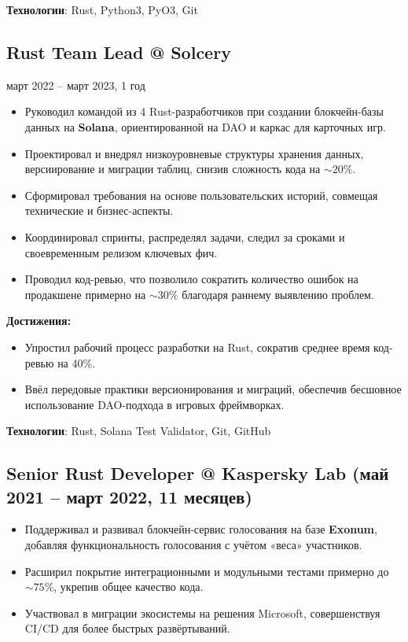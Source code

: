 \documentclass[a4paper,12pt]{article}
\begin{document}
\textbf{Технологии}: Rust, Python3, PyO3, Git

\vspace{3mm}

\subsection*{Rust Team Lead @ Solcery}
\quad март 2022 – март 2023, 1 год
\begin{itemize}[leftmargin=15pt]
    \item Руководил командой из 4 Rust-разработчиков при создании блокчейн-базы данных на \textbf{Solana}, ориентированной на DAO и каркас для карточных игр.
    \item Проектировал и внедрял низкоуровневые структуры хранения данных, версиирование и миграции таблиц, снизив сложность кода на \(\sim 20\%\).
    \item Сформировал требования на основе пользовательских историй, совмещая технические и бизнес-аспекты.
    \item Координировал спринты, распределял задачи, следил за сроками и своевременным релизом ключевых фич.
    \item Проводил код-ревью, что позволило сократить количество ошибок на продакшене примерно на \(\sim 30\%\) благодаря раннему выявлению проблем.
\end{itemize}

\textbf{Достижения:}
\begin{itemize}[leftmargin=15pt]
    \item Упростил рабочий процесс разработки на Rust, сократив среднее время код-ревью на 40\%.
    \item Ввёл передовые практики версионирования и миграций, обеспечив бесшовное использование DAO-подхода в игровых фреймворках.
\end{itemize}

\textbf{Технологии}: Rust, Solana Test Validator, Git, GitHub

\vspace{3mm}

\subsection*{Senior Rust Developer @ Kaspersky Lab \quad (май 2021 – март 2022, 11 месяцев)}
\begin{itemize}[leftmargin=15pt]
    \item Поддерживал и развивал блокчейн-сервис голосования на базе \textbf{Exonum}, добавляя функциональность голосования с учётом «веса» участников.
    \item Расширил покрытие интеграционными и модульными тестами примерно до \(\sim 75\%\), укрепив общее качество кода.
    \item Участвовал в миграции экосистемы на решения Microsoft, совершенствуя CI/CD для более быстрых развёртываний.
\end{itemize}
\end{document}
